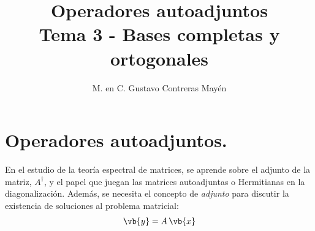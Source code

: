 
\title{Operadores autoadjuntos \\ \large {Tema 3 - Bases completas y ortogonales}\vspace{-3ex}}

\author{M. en C. Gustavo Contreras Mayén}
\date{ }

\pagestyle{fancy}
\fancyhf{}
\lhead{\leftmark}
\rfoot{\thepage}
\setlength{\headheight}{16pt}%



\maketitle
\fontsize{14}{14}\selectfont
\tableofcontents
\newpage

\section{Operadores autoadjuntos.}

En el estudio de la teoría espectral de matrices, se aprende sobre el adjunto de la matriz, $A^{\dagger}$, y el papel que juegan las matrices autoadjuntas o Hermitianas en la diagonalización. Además, se necesita el concepto de \emph{adjunto} para discutir la existencia de soluciones al problema matricial:
\begin{align*}
\vb{y} = A \, \vb{x}
\end{align*}

